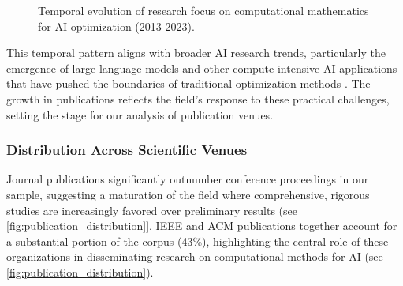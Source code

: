 \documentclass[acmsmall]{acmart}
\begin{document}
\begin{figure}[ht]
    \centering
    \caption{Temporal evolution of research focus on computational mathematics for AI optimization (2013-2023).}
    \label{fig:temporal_evolution}
\end{figure}

This temporal pattern aligns with broader AI research trends, particularly the emergence of large language models and other compute-intensive AI applications that have pushed the boundaries of traditional optimization methods \citep{ataei2024filtering}. The growth in publications reflects the field's response to these practical challenges, setting the stage for our analysis of publication venues.

\subsubsection{Distribution Across Scientific Venues}\label{subsubsec:overview-of-included-studies:distribution-across-scientific-venues}
Journal publications significantly outnumber conference proceedings in our sample, suggesting a maturation of the field where comprehensive, rigorous studies are increasingly favored over preliminary results (see \cref{fig:publication_distribution}]. IEEE and ACM publications together account for a substantial portion of the corpus (43\%), highlighting the central role of these organizations in disseminating research on computational methods for AI (see \cref{fig:publication_distribution}).
\end{document}
